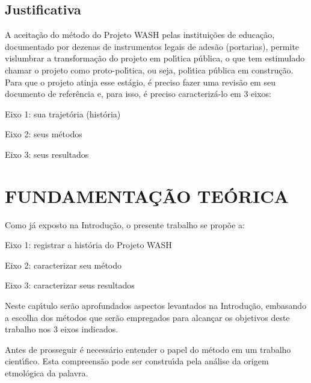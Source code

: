 \documentclass[
12pt,		%
openright,	%
twoside,  %
a4paper,			%
chapter=TITLE,		%
english,			%
french,				%
spanish,			%
brazil				%
]{USPSC-classe/USPSC}
\begin{document}
\section[Justificativa]{Justificativa}\label{Justificativa}
A aceita\c{c}\~ao do m\'etodo do Projeto WASH pelas institui\c{c}\~oes de educa\c{c}\~ao, documentado por dezenas de instrumentos legais de ades\~ao (portarias), permite vislumbrar a transforma\c{c}\~ao do projeto em pol\'{\i}tica p\'ublica, o que tem estimulado chamar o projeto como \textquotedbl proto-pol\'{\i}tica\textquotedbl , ou seja, pol\'{\i}tica p\'ublica em constru\c{c}\~ao. Para que o projeto atinja esse est\'agio, \'e preciso fazer uma revis\~ao em seu documento de refer\^encia e, para isso, \'e preciso caracteriz\'a-lo em 3 eixos:



\begin{alineas}
\item Eixo 1: sua trajet\'oria (hist\'oria)
\item Eixo 2: seus m\'etodos
\item Eixo 3: seus resultados
\end{alineas}

\chapter[FUNDAMENTA\c{C}\~AO TE\'ORICA ]{FUNDAMENTA\c{C}\~AO TE\'ORICA }\label{FUNDAMENTA\c{C}\~AO TE\'ORICA }
Como j\'a exposto na \textquotedbl Introdu\c{c}\~ao\textquotedbl , o presente trabalho se prop\~oe a:



\begin{alineas}
\item Eixo 1: registrar a hist\'oria do Projeto WASH
\item Eixo 2: caracterizar seu m\'etodo
\item Eixo 3: caracterizar seus resultados
\end{alineas}

Neste cap\'{\i}tulo ser\~ao aprofundados aspectos levantados na Introdu\c{c}\~ao, embasando a escolha dos m\'etodos que ser\~ao empregados para alcan\c{c}ar os objetivos deste trabalho nos 3 eixos indicados.


Antes de prosseguir \'e necess\'ario entender o papel do m\'etodo em um trabalho cient\'{\i}fico. Esta compreens\~ao pode ser constru\'{\i}da pela an\'alise da origem etmol\'ogica da palavra.
\end{document}
